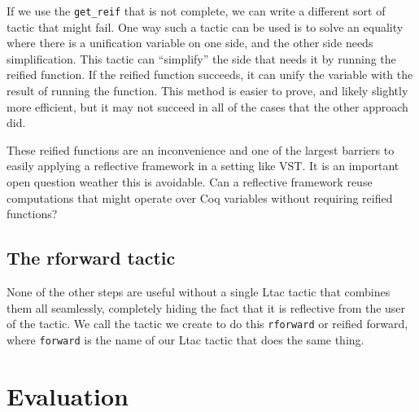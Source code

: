 \documentclass{puthesis}
\begin{document}
If we use the \lstinline|get_reif| that is not complete, we can write a
different sort of tactic that might fail. One way such a tactic can be
used is to solve an equality where there is a unification variable on
one side, and the other side needs simplification. This tactic can
``simplify'' the side that needs it by running the reified
function. If the reified function succeeds, it can unify the variable
with the result of running the function. This method is easier to
prove, and likely slightly more efficient, but it may not succeed in
all of the cases that the other approach did.

These reified functions are an inconvenience and one of the largest
barriers to easily applying a reflective framework in a setting like
VST. It is an important open question weather this is avoidable. Can
a reflective framework reuse computations that might operate
over Coq variables without requiring reified functions? 

\section{The rforward tactic}

None of the other steps are useful without a single Ltac tactic that
combines them all seamlessly, completely hiding the fact that it is
reflective from the user of the tactic. We call the tactic we create
to do this \lstinline|rforward| or reified forward, where
\lstinline|forward| is the name of our Ltac tactic that does the same
thing. 

\chapter{Evaluation}
\end{document}

